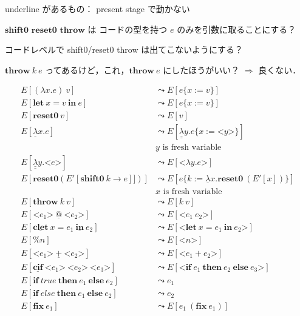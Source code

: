 \documentclass[10pt,a4j]{jarticle}
\makeatletter
\newcommand\fun[2]{\lambda{#1}.{#2}}
\newcommand\Resetz{\textbf{reset0}}
\newcommand\Shiftz{\textbf{shift0}}
\newcommand\Throw{\textbf{throw}}
\newcommand\resetz[1]{\Resetz~{#1}}
\newcommand\cfun[2]{\underline{\lambda}{#1}.{#2}}
\newcommand\ccfun[2]{\underline{\underline{\lambda}}{#1}.{#2}}
\newcommand\cResetz{\underline{\textbf{reset0}}}
\newcommand\cShiftz{\underline{\textbf{shift0}}}
\newcommand\cThrow{\underline{\textbf{throw}}}
\newcommand\cPlus{\underline{\textbf{+}}}
\newcommand\cLet{\underline{\textbf{clet}}}
\newcommand\cIn{\underline{\textbf{in}}}
\newcommand\clet[3]{\cLet~{#1}={#2}~\cIn~{#3}}
\newcommand\code[1]{\texttt{<}{#1}\texttt{>}}
\newcommand\Let{\textbf{let}}
\newcommand\In{\textbf{in}}
\newcommand\letin[3]{\Let~{#1}={#2}~\In~{#3}}
\newcommand\ift[3]{\textbf{if}~{#1}~\textbf{then}~{#2}~\textbf{else}~{#3}}
\newcommand\cif[3]{\underline{\textbf{cif}}~\code{{#1}}~\code{{#2}}~\code{{#3}}}
\newcommand\fix{\textbf{fix}}
\newcommand\lto{\leadsto}
\newcommand\cat{~\underline{@}~}
\theoremstyle{break}
\makeatother
\begin{document}
underline があるもの： present stage で動かない

$\Shiftz$ $\Resetz$ $\Throw$ は コードの型を持つ $e$ のみを引数に取ることにする？

コードレベルで shift0/reset0 throw は出てこないようにする？

$\Throw~ k~ e$ ってあるけど，これ，$\Throw~ e$ にしたほうがいい？ $\Rightarrow$ 良くない．

\begin{align*}
  E[(\fun{x}{e})~v] &\lto E[e\{ x := v \}] \\
  E[\letin{x}{v}{e}] &\lto E[e\{ x := v \}]\\
  E[\Resetz~ v] &\lto E[v] \\
  E[\cfun{x}{e}] &\lto E[\ccfun{y}{e\{ x := \code{y} \}}] \\
                    &y \text{ is fresh variable} \\
  E[\ccfun{y}{\code{e}}] &\lto E[\code{\fun{y}{e}}] \\
  E[\Resetz (E'[\Shiftz~ k \to e]])] &\lto E[e \{k := \cfun{x}{\Resetz~ (E'[x])} \}] \\
                    &x \text{ is fresh variable} \\
  E[\Throw~ k~ v] &\lto E[k~ v] \\
  E[\code{e_1} \cat \code{e_2}] &\lto E[\code{e_1~ e_2}] \\
  E[\clet{x}{e_1}{e_2}] &\lto E[\code{\letin{x}{e_1}{e_2}}] \\
  E[\% n] &\lto E[\code{n}] \\
  E[\code{e_1}~ \cPlus~ \code{e_2}] &\lto E[\code{e_1 + e_2}] \\
  E[\cif{e_1}{e_2}{e_3}] &\lto E[\code{\ift{e_1}{e_2}{e_3}}] \\
  E[\ift{true}{e_1}{e_2}] &\lto e_1 \\
  E[\ift{else}{e_1}{e_2}] &\lto e_2 \\
  E[\fix~ e_1] &\lto E[e_1~ (\fix~ e_1)] \\
\end{align*}
\end{document}
